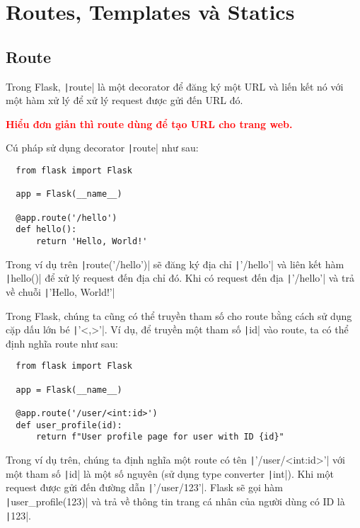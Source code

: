 \documentclass[main.tex]{subfiles}
\begin{document}
\chapter{Routes, Templates và Statics}

\section{Route}

Trong Flask, \texttt|route| là một decorator để đăng ký một URL và liến kết nó với một hàm xử lý để xử lý request được gửi đến URL đó.

\textcolor{red}{\bfseries
Hiểu đơn giản thì route dùng để tạo URL cho trang web.
}

Cú pháp sử dụng decorator \texttt|route| như sau:

\begin{verbatim}
  from flask import Flask

  app = Flask(__name__)

  @app.route('/hello')
  def hello():
      return 'Hello, World!'
\end{verbatim}

Trong ví dụ trên \texttt|route('/hello')| sẽ đăng ký địa chỉ \texttt|'/hello'| và liên kết hàm \texttt|hello()| để xử lý request đến địa chỉ đó. Khi có request đến địa \texttt|'/hello'| và trả về chuỗi \texttt|'Hello, World!'|

Trong Flask, chúng ta cũng có thể truyền tham số cho route bằng cách sử dụng cặp dấu lớn bé \texttt|'<,>'|. Ví dụ, để truyền một tham số \texttt|id| vào route, ta có thể định nghĩa route như sau:

\begin{verbatim}
  from flask import Flask

  app = Flask(__name__)

  @app.route('/user/<int:id>')
  def user_profile(id):
      return f"User profile page for user with ID {id}"
\end{verbatim}

Trong ví dụ trên, chúng ta định nghĩa một route có tên 
\texttt|'/user/<int:id>'| với một tham số \texttt|id| là một số nguyên 
(sử dụng type converter \texttt|int|). Khi một request được gửi đến
đường dẫn \texttt|'/user/123'|.
Flask sẽ gọi hàm \texttt|user_profile(123)| và trả về thông tin trang cá nhân của người dùng có ID là \texttt|123|.
\end{document}
